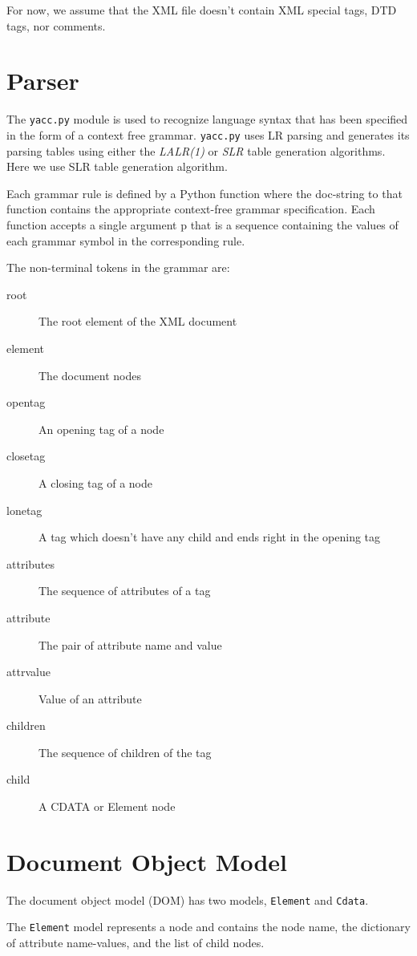 \documentclass{article}
\begin{document}
For now, we assume that the XML file doesn't contain XML special tags, DTD
tags, nor comments.

\section{Parser}

The {\tt yacc.py} module is used to recognize language syntax that has been
specified in the form of a context free grammar.  {\tt yacc.py} uses LR
parsing and generates its parsing tables using either the \emph{LALR(1)} or
\emph{SLR} table generation algorithms. Here we use SLR table generation
algorithm.

Each grammar rule is defined by a Python function where the doc-string to that
function contains the appropriate context-free grammar specification.  Each
function accepts a single argument p that is a sequence containing the values
of each grammar symbol in the corresponding rule.

The non-terminal tokens in the grammar are:
\begin{description}
  \item[root] The root element of the XML document
  \item[element] The document nodes
  \item[opentag] An opening tag of a node
  \item[closetag] A closing tag of a node
  \item[lonetag] A tag which doesn't have any child and ends right in the
  opening tag
  \item[attributes] The sequence of attributes of a tag
  \item[attribute] The pair of attribute name and value
  \item[attrvalue] Value of an attribute
  \item[children] The sequence of children of the tag
  \item[child] A CDATA or Element node
\end{description}


\section{Document Object Model}

The document object model (DOM) has two models, {\tt Element} and {\tt Cdata}.

The {\tt Element} model represents a node and contains the node name,
the dictionary of attribute name-values, and the list of child nodes.
\end{document}
